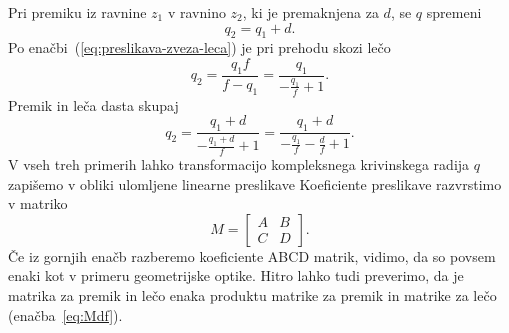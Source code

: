 Pri premiku iz ravnine $z_1$ v ravnino $z_2$, ki je premaknjena
za $d$, se $q$ spremeni 
\begin{equation}
q_2=q_1+d.
\end{equation}
Po enačbi~(\ref{eq:preslikava-zveza-leca}) je pri prehodu skozi lečo
\begin{equation}
q_2=\frac{q_1f}{f-q_1}=\frac{q_1}{-\frac{q_1}{f}+1}.
\end{equation}
Premik in leča dasta skupaj
\begin{equation}
q_2=\frac{q_1+d}{-\frac{q_1+d}{f}+1}=\frac{q_1+d}{-\frac{q_1}{f}-\frac{d}{f}+1}.
\end{equation}
V vseh treh primerih lahko transformacijo kompleksnega krivinskega radija 
$q$ zapišemo v obliki ulomljene
linearne preslikave 
Koeficiente preslikave razvrstimo v matriko 
\begin{equation}
M= \left[\begin{array}{cc}
A & B\\
C & D
\end{array}\right].
\end{equation}
Če iz gornjih enačb razberemo koeficiente ABCD matrik,
vidimo, da so povsem enaki kot v primeru geometrijske optike. Hitro lahko tudi preverimo, 
da je matrika za premik in lečo enaka produktu matrike za premik in matrike za lečo
(enačba~\ref{eq:Mdf}). 

